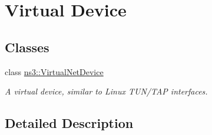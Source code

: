\hypertarget{group__virtual-net-device}{}\section{Virtual Device}
\label{group__virtual-net-device}
\subsection*{Classes}
\begin{DoxyCompactItemize}
\item 
class \hyperlink{classns3_1_1VirtualNetDevice}{ns3\+::\+Virtual\+Net\+Device}
\begin{DoxyCompactList}\small\item\em A virtual device, similar to Linux T\+U\+N/\+T\+AP interfaces. \end{DoxyCompactList}\end{DoxyCompactItemize}


\subsection{Detailed Description}
